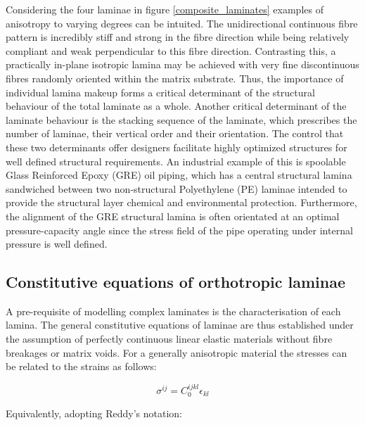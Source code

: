Considering the four laminae in figure \ref{composite_laminates} examples of anisotropy to varying degrees can be intuited. The unidirectional continuous fibre pattern is incredibly stiff and strong in the fibre direction while being relatively compliant and weak  perpendicular to this fibre direction. Contrasting this, a practically in-plane isotropic lamina may be achieved with very fine discontinuous fibres randomly oriented within the matrix substrate. Thus, the importance of individual lamina makeup forms a critical determinant of the structural behaviour of the total laminate as a whole. Another critical determinant of the laminate behaviour is the stacking sequence of the laminate, which prescribes the number of laminae, their vertical order and their orientation. The control that these two determinants offer designers facilitate highly optimized structures for well defined structural requirements.
An industrial example of this is spoolable Glass Reinforced Epoxy (GRE) oil piping, which has a central structural lamina sandwiched between two non-structural Polyethylene (PE) laminae intended to provide the structural layer chemical and environmental protection. Furthermore, the alignment of the GRE structural lamina is often orientated at an optimal pressure-capacity angle since the stress field of the pipe operating under internal pressure is well defined.

\subsection{Constitutive equations of orthotropic laminae}

A pre-requisite of modelling complex laminates is the characterisation of each lamina. The general constitutive equations of laminae are thus established under the assumption of perfectly continuous linear elastic materials without fibre breakages or matrix voids. For a generally anisotropic material the stresses can be related to the strains as follows:

\begin{equation} 
\sigma^{ij} = C_0^{ijkl} \epsilon_{kl}
\label{eqscomp1}
\end{equation}

Equivalently, adopting Reddy's \cite{reddy2004mechanics} notation:

